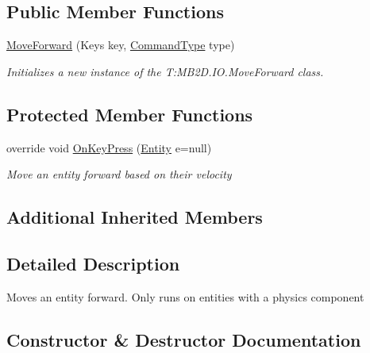 \subsection*{Public Member Functions}
\begin{DoxyCompactItemize}
\item 
\hyperlink{class_m_b2_d_1_1_i_o_1_1_move_forward_a2f87f71aa920e4b6ac2aa4924a04ce27}{Move\+Forward} (Keys key, \hyperlink{namespace_m_b2_d_1_1_i_o_ab5f95f3fe9e652778b62bdf943168a68}{Command\+Type} type)
\begin{DoxyCompactList}\small\item\em Initializes a new instance of the T\+:\+M\+B2\+D.\+I\+O.\+Move\+Forward class. \end{DoxyCompactList}\end{DoxyCompactItemize}
\subsection*{Protected Member Functions}
\begin{DoxyCompactItemize}
\item 
override void \hyperlink{class_m_b2_d_1_1_i_o_1_1_move_forward_a32d5bfbf101ab8ff8150f2f07f0b5ac8}{On\+Key\+Press} (\hyperlink{class_m_b2_d_1_1_entity_component_1_1_entity}{Entity} e=null)
\begin{DoxyCompactList}\small\item\em Move an entity forward based on their velocity \end{DoxyCompactList}\end{DoxyCompactItemize}
\subsection*{Additional Inherited Members}


\subsection{Detailed Description}
Moves an entity forward. Only runs on entities with a physics component 



\subsection{Constructor \& Destructor Documentation}
\hypertarget{class_m_b2_d_1_1_i_o_1_1_move_forward_a2f87f71aa920e4b6ac2aa4924a04ce27}{}\label{class_m_b2_d_1_1_i_o_1_1_move_forward_a2f87f71aa920e4b6ac2aa4924a04ce27} 
